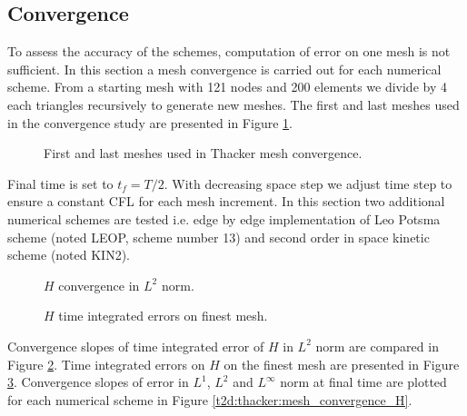 \subsection{Convergence}

To assess the accuracy of the schemes, computation of error on one mesh is not
sufficient.
In this section a mesh convergence is carried out for each numerical scheme.
From a starting mesh with 121 nodes and 200 elements we divide by 4 each
triangles recursively to generate new meshes.
The first and last meshes used in the convergence study are presented in Figure
\ref{t2d:cone:meshes}.

\begin{figure}[h!]
\begin{minipage}[t]{0.5\textwidth}
 \centering
\end{minipage}
\begin{minipage}[t]{0.5\textwidth}
 \centering
\end{minipage}
 \caption{First and last meshes used in Thacker mesh convergence.}
 \label{t2d:cone:meshes}
\end{figure}

Final time is set to $t_f = T/2$.
With decreasing space step we adjust time step to ensure a constant CFL for each
mesh increment.
In this section two additional numerical schemes are tested
i.e. edge by edge implementation of Leo Potsma scheme (noted LEOP, scheme number 13)
and second order in space kinetic scheme (noted KIN2).

\begin{figure}[H]
\centering
  \caption{$H$ convergence in $L^2$ norm.}
\label{fig:thacker:ErrNumH_convergence}
\end{figure}

\begin{figure}[H]
\centering
  \caption{$H$ time integrated errors on finest mesh.}
\label{fig:thacker:ErrNumH_convergence_mesh3}
\end{figure}

Convergence slopes of time integrated error of $H$ in $L^2$ norm are compared in
Figure \ref{fig:thacker:ErrNumH_convergence}.
Time integrated errors on $H$ on the finest mesh are presented in Figure
\ref{fig:thacker:ErrNumH_convergence_mesh3}.
Convergence slopes of error in $L^1$, $L^2$ and $L^\infty$ norm at final time
are plotted for each numerical scheme in Figure \ref{t2d:thacker:mesh_convergence_H}.

